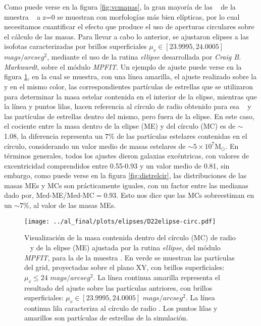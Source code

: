 Como puede verse en la figura \ref{fig:vcmapas}, la gran mayor\'ia de las
\bcgs~ de la muestra \cmay~ a z=0 se muestran con morfolog\'ias m\'as bien
el\'ipticas, por lo cual
necesitamos cuantificar el efecto que produce el uso de
aperturas circulares sobre el c\'alculo de las masas. Para llevar a cabo lo anterior,
se ajustaron elipses a las isofotas caracterizadas
por brillos superficiales $\mu_{v} \in [23.9995,24.0005]$ $mags/arcseg^{2}$, mediante
el uso de la rutina \textit{ellipse} desarrollada
por \textit{Craig B. Markwardt},
sobre el m\'odulo \textit{MPFIT}. Un ejemplo de ajuste 
puede verse en la figura \ref{fig:elipses}, en la cual
se muestra, con una l\'inea amarilla, el ajuste realizado sobre la  y en el
mismo color, las correspondientes
part\'iculas de estrellas que se utilizaron para determinar la masa estelar contenida en el interior
de la elipse, mientras que la l\'inea y puntos lilas, hacen referencia al c\'irculo de radio
\rvc obtenido para esa \bcg~ y las part\'iculas de estrellas
dentro del mismo, pero fuera de la elipse. En este caso, el cociente
entre la masa dentro de la elipse (ME)
y del c\'irculo (MC) es de $\sim$ 1.08, la diferencia representa un $7\%$ de las
part\'iculas estelares contenidas en el c\'irculo, considerando un valor medio de masas
estelares de $\sim 5 \times 10^{7}$M$_{\odot}$.
En t\'erminos generales, todos los ajustes dieron galaxias exc\'entricas, con valores de
excentricidad comprendidos entre 0.55-0.93 y un valor medio de 0.81, sin embargo, como
puede verse en la  figura \ref{fig:distrelcir}, las distribuciones de las masas
MEs y MCs son pr\'acticamente iguales, con un factor entre las medianas dado por,
Med-ME/Med-MC$= 0.93$. 
Esto nos dice que las MCs sobreestiman en un $\sim 7\%$, al valor de las masas MEs.

\begin{figure}[H]
 \centering
 \texttt{[image: ../al\_final/plots/elipses/D22elipse-circ.pdf]}
\caption{Visualizaci\'on de la masa contenida dentro del c\'irculo (MC) de radio \rvc~ y
de la elipse (ME) ajustada por la rutina \textit{ellipse}, del m\'odulo \textit{MPFIT},
para la  de la muestra \cmay.
En verde se muestran las part\'iculas del grid, proyectadas sobre el plano XY, con brillos
superficiales: $\mu_{v} \leq 24$ $mags/arcseg^{2}$. 
La l\'inea continua amarilla representa
el resultado del ajuste sobre las part\'iculas antriores, con brillos superficiales: $\mu_{v} \in [23.9995,24.0005]$ $mags/arcseg^{2}$. La 
l\'inea continua lila caracteriza al c\'irculo de radio \rvc. Los puntos lilas y amarillos son part\'iculas de estrellas de la simulaci\'on.}
\label{fig:elipses}
\end{figure}

